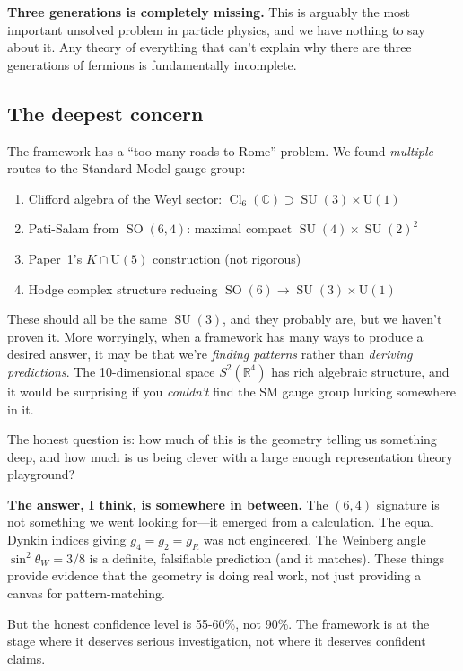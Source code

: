\documentclass[12pt,a4paper]{article}
\DeclareMathOperator{\SO}{SO}
\DeclareMathOperator{\SU}{SU}
\DeclareMathOperator{\Cl}{Cl}
\begin{document}
\begin{honestbox}
\textbf{Three generations is completely missing.} This is arguably the most important unsolved problem in particle physics, and we have nothing to say about it. Any theory of everything that can't explain why there are three generations of fermions is fundamentally incomplete.

\subsection*{The deepest concern}

The framework has a ``too many roads to Rome'' problem. We found \textit{multiple} routes to the Standard Model gauge group:
\begin{enumerate}
\item Clifford algebra of the Weyl sector: $\Cl_6(\mathbb{C}) \supset \SU(3)\times\mathrm{U}(1)$
\item Pati-Salam from $\SO(6,4)$: maximal compact $\SU(4)\times\SU(2)^2$
\item Paper~1's $K \cap \mathrm{U}(5)$ construction (not rigorous)
\item Hodge complex structure reducing $\SO(6) \to \SU(3)\times\mathrm{U}(1)$
\end{enumerate}

These should all be the same $\SU(3)$, and they probably are, but we haven't proven it. More worryingly, when a framework has many ways to produce a desired answer, it may be that we're \textit{finding patterns} rather than \textit{deriving predictions}. The 10-dimensional space $S^2(\mathbb{R}^4)$ has rich algebraic structure, and it would be surprising if you \textit{couldn't} find the SM gauge group lurking somewhere in it.

The honest question is: how much of this is the geometry telling us something deep, and how much is us being clever with a large enough representation theory playground?

\textbf{The answer, I think, is somewhere in between.} The $(6,4)$ signature is not something we went looking for---it emerged from a calculation. The equal Dynkin indices giving $g_4 = g_2 = g_R$ was not engineered. The Weinberg angle $\sin^2\theta_W = 3/8$ is a definite, falsifiable prediction (and it matches). These things provide evidence that the geometry is doing real work, not just providing a canvas for pattern-matching.

But the honest confidence level is 55-60\%, not 90\%. The framework is at the stage where it deserves serious investigation, not where it deserves confident claims.


\end{honestbox}
\end{document}
